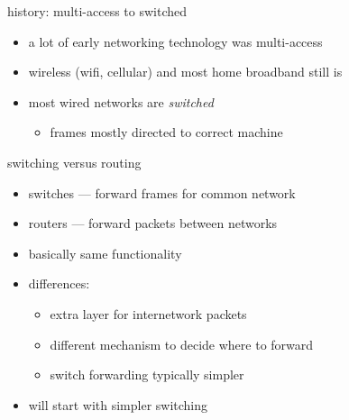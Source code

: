 \begin{frame}{history: multi-access to switched}
    \begin{itemize}
    \item a lot of early networking technology was multi-access
    \item wireless (wifi, cellular) and most home broadband still is
    \vspace{.5cm}
    \item most wired networks are \textit{switched}
        \begin{itemize}
        \item frames mostly directed to correct machine
        \end{itemize}
    \end{itemize}
\end{frame}

\begin{frame}{switching versus routing}
    \begin{itemize}
    \item switches --- forward frames for common network
    \item routers --- forward packets between networks
    \vspace{.5cm}
    \item basically same functionality
    \item differences:
        \begin{itemize}
        \item extra layer for internetwork packets
        \item different mechanism to decide where to forward
        \item switch forwarding typically simpler
        \end{itemize}
    \item will start with simpler switching
    \end{itemize}
\end{frame}

